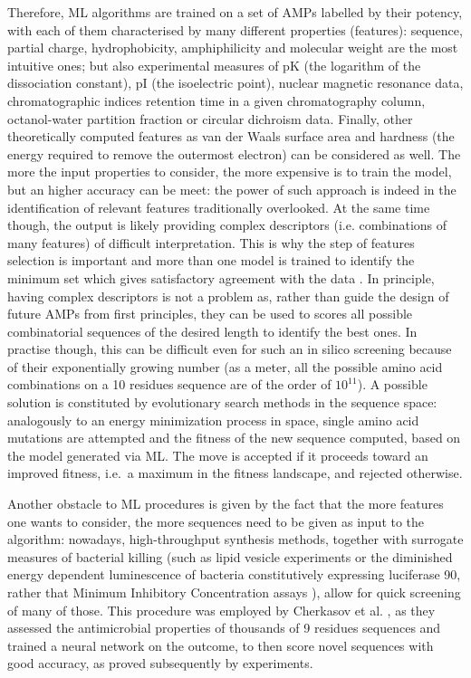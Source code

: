 Therefore, ML algorithms are trained on a set of AMPs labelled by their potency, with each of them characterised by many different properties (features): sequence, partial charge, hydrophobicity, amphiphilicity and molecular weight are the most intuitive ones; but also experimental measures of pK (the logarithm of the dissociation constant), pI (the isoelectric point), nuclear magnetic resonance data, chromatographic indices retention time in a given chromatography column, octanol-water partition fraction or circular dichroism data. Finally, other theoretically computed features as van der Waals surface area and hardness (the energy required to remove the outermost electron) can be considered as well.
%
The more the input properties to consider, the more expensive is to train the model, but an higher accuracy can be meet: the power of such approach is indeed in the identification of relevant features traditionally overlooked. At the same time though, the output is likely providing complex descriptors (i.e. combinations of many features) of difficult interpretation. This is why the step of features selection is important and more than one model is trained to identify the minimum set which gives satisfactory agreement with the data \cite{Walters2005,Gonzalez2008}.
%
In principle, having complex descriptors is not a problem as, rather than guide the design of future AMPs from first principles, they can be used to scores all possible combinatorial sequences of the desired length to identify the best ones. In practise though, this can be difficult even for such an in silico screening because of their exponentially growing number (as a meter, all the possible amino acid combinations on a 10 residues sequence are of the order of $10^{11}$).
%
A possible solution is constituted by evolutionary search methods in the sequence space: analogously to an energy minimization process in space, single amino acid mutations are attempted and the fitness of the new sequence computed, based on the model generated via ML. The move is accepted if it proceeds toward an improved fitness, i.e.\ a maximum in the fitness landscape, and rejected otherwise.

Another obstacle to ML procedures is given by the fact that the more features one wants to consider, the more sequences need to be given as input to the algorithm: nowadays, high-throughput synthesis methods, together with surrogate measures of bacterial killing (such as lipid vesicle experiments \cite{Wimley2010} or the diminished energy dependent luminescence of bacteria constitutively expressing luciferase 90, rather that Minimum Inhibitory Concentration assays \cite{Lewenza2005}), allow for quick screening of many of those.
%
This procedure was employed by Cherkasov et al. \cite{Cherkasov2009}, as they assessed the antimicrobial properties of thousands of 9 residues sequences and trained a neural network on the outcome, to then score novel sequences with good accuracy, as proved subsequently by experiments.

